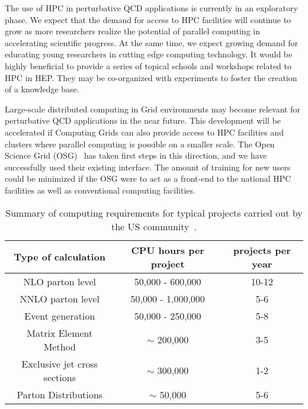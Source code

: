 The use of HPC in perturbative QCD applications is currently in
an exploratory phase. We expect that the demand for access to HPC
facilities will continue to grow as more researchers realize the 
potential of parallel computing in accelerating scientific progress. 
At the same time, we expect growing demand for educating young researchers 
in cutting edge computing technology. It would be highly beneficial 
to provide a series of topical schools and workshops related 
to HPC in HEP. They may be co-organized with experiments to foster 
the creation of a knowledge base.

Large-scale distributed computing in Grid environments 
may become relevant for perturbative QCD applications 
in the near future. This development will be accelerated if Computing Grids
can also provide access to HPC facilities and clusters where parallel 
computing is possible on a smaller scale. The Open Science Grid (OSG)~\cite{OSG} 
has taken first steps in this direction, and we have successfully used their
existing interface. The amount of training for new users could be minimized
if the OSG were to act as a front-end to the national HPC facilities
as well as conventional computing facilities.

\begin{table}
  \begin{tabular}{ccc}
    \hline
    Type of calculation & CPU hours per project & projects per year \\
    \hline\hline
    NLO parton level & 50,000 - 600,000 & 10-12\\
    NNLO parton level & 50,000 - 1,000,000 & 5-6\\
    Event generation & 50,000 - 250,000 & 5-8\\
    Matrix Element Method & $\sim$ 200,000 & 3-5\\
    Exclusive jet cross sections & $\sim$ 300,000 & 1-2\\
    Parton Distributions & $\sim$ 50,000 & 5-6\\
    \hline
  \end{tabular}
  \caption{Summary of computing requirements for typical projects
    carried out by the US community~\cite{HPCWP}.
    \label{tab:summary}}
\end{table}



